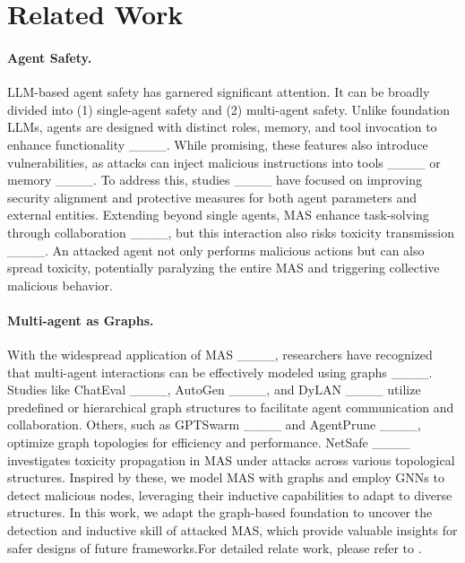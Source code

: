 \section{Related Work}
\vspace{-0.2em}


\paragraph{Agent Safety.} LLM-based agent safety has garnered significant attention. It can be broadly divided into (1) single-agent safety and (2) multi-agent safety. Unlike foundation LLMs, agents are designed with distinct roles, memory, and tool invocation to enhance functionality ____. While promising, these features also introduce vulnerabilities, as attacks can inject malicious instructions into tools ____ or memory ____. To address this, studies ____ have focused on improving security alignment and protective measures for both agent parameters and external entities. Extending beyond single agents, MAS enhance task-solving through collaboration ____, but this interaction also risks toxicity transmission ____. An attacked agent not only performs malicious actions but can also spread toxicity, potentially paralyzing the entire MAS and triggering collective malicious behavior.

\vspace{-0.5em}
\paragraph{Multi-agent as Graphs.} With the widespread application of MAS ____, researchers have recognized that multi-agent interactions can be effectively modeled using graphs ____. Studies like ChatEval ____, AutoGen ____, and DyLAN ____ utilize predefined or hierarchical graph structures to facilitate agent communication and collaboration. Others, such as GPTSwarm ____ and AgentPrune ____, optimize graph topologies for efficiency and performance. NetSafe ____ investigates toxicity propagation in MAS under attacks across various topological structures. Inspired by these, we model MAS with graphs and employ GNNs to detect malicious nodes, leveraging their inductive capabilities to adapt to diverse structures. In this work, we adapt the graph-based foundation to uncover the detection and inductive skill of attacked MAS, which provide valuable insights for safer designs of future frameworks.For detailed relate work, please refer to .